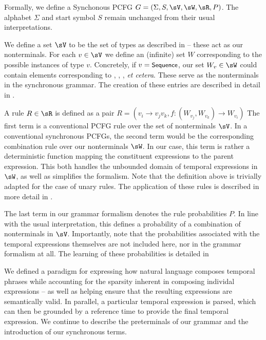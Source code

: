 Formally, we define a Synchonous PCFG 
	$G = \left(\Sigma,S,\sV,\sW,\sR,P\right)$.
The alphabet $\Sigma$ and start symbol $S$ remain unchanged from their
	usual interpretations.

We define a set $\sV$ to be the set of types as described in
	 -- these act as our nonterminals.
For each $v \in \sV$ we define an (infinite) set $W$ corresponding to the 
	possible instances of type $v$.
Concretely, if $v=\textsf{\small{Sequence}}$, our set $W_v \in \sW$ could contain elements
	corresponding to , , ,
	\textit{et cetera}.
These serve as the nonterminals in the synchronous grammar.
The creation of these entries are described in detail in .

A rule $R \in \sR$ is defined as a pair 
	$R = \left(v_i \rightarrow v_jv_k, 
		f : (W_{v_j},W_{v_k}) \rightarrow W_{v_i}\right)$
The first term is a conventional PCFG rule over the set of nonterminals
	$\sV$.
In a conventional synchronous PCFGs, the second term would be the corresponding
	combination rule over our nonterminals $\sW$.
In our case, this term is rather a deterministic function mapping the
	constituent expressions to the parent expression.
This both handles the unbounded domain of temporal expressions in $\sW$,
	as well as simplifies the formalism.
Note that the definition above is trivially adapted for the case of unary
	rules.
The application of these rules is described in more detail in 
	.

The last term in our grammar formalism denotes the rule probabilities $P$.
In line with the usual interpretation, this defines a probability
	of a combination of nonterminals in $\sV$.
Importantly, note that the probabilities associated with the temporal
	expressions themselves are not included here, nor in the grammar
	formalism at all.
The learning of these probabilities is detailed in 

We defined a paradigm for expressing how natural language composes
	temporal phrases while accounting for the sparsity inherent in composing
	individal expressions -- as well as helping ensure that the resulting
	expressions are semantically valid.
In parallel, a particular temporal expression is parsed, which can then
	be grounded by a reference time to provide the final temporal expression.
We continue to describe the preterminals of our grammar and the introduction
	of our synchronous terms.


